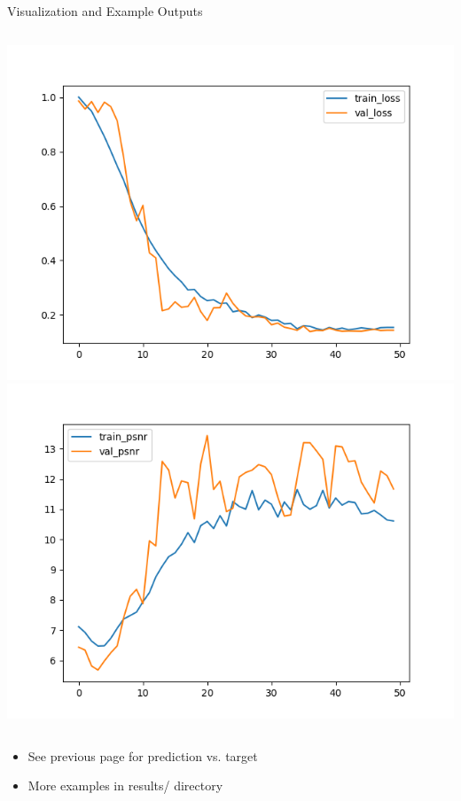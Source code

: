 \documentclass{beamer}
\begin{document}
\begin{frame}{Visualization and Example Outputs}
\begin{columns}
    \includegraphics[width=0.95\linewidth]{results/losses.png}
    \vspace{1em}
    \includegraphics[width=0.95\linewidth]{results/psnrs.png}
\end{columns}
\vspace{0.5em}
\begin{itemize}
    \item See previous page for prediction vs. target
    \item More examples in results/ directory
\end{itemize}
\end{frame}
\end{document}
